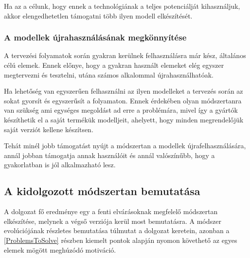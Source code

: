         Ha az a célunk, hogy ennek a technológiának a teljes potenciálját kihasználjuk, akkor elengedhetetlen támogatni több ilyen modell elkészítését.

        \subsubsection{A modellek újrahasználásának megkönnyítése} \label{sec:Ujrahasznalas}
        A tervezési folyamatok során gyakran kerülnek felhasználásra már kész, általános célú elemek.
        Ennek előnye, hogy a gyakran használt elemeket elég egyszer megtervezni és tesztelni, utána számos alkalommal újrahasználhatóak.
        
        Ha lehetőség van egyszerűen felhasználni az ilyen modelleket a tervezés során az sokat gyorsít és egyszerűsít a folyamaton.
        Ennek érdekében olyan módszertanra van szükség ami egységes megoldást ad erre a problémára, mivel így a gyártók készíthetik el a saját termékük modelljeit, ahelyett, hogy minden megrendelőjük saját verziót kellene készítsen.
        
        Tehát minél jobb támogatást nyújt a módszertan a modellek újrafelhasználására, annál jobban támogatja annak használóit és annál valószínűbb, hogy a gyakorlatban is jól alkalmazható lesz.

    \subsection{A kidolgozott módszertan bemutatása}
    A dolgozat fő eredménye egy a fenti elvárásoknak megfelelő módszertan elkészítése, melynek a végső verziója kerül most bemutatásra. A módszer evolúciójának részletes bemutatása túlmutat a dolgozat keretein, azonban a \ref{ProblemsToSolve} részben kiemelt pontok alapján nyomon követhető az egyes elemek mögött meghúzódó motiváció.
        

